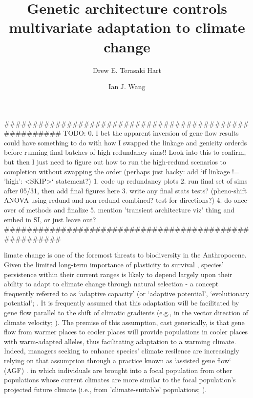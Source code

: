 \documentclass[9pt,twocolumn,twoside,lineno]{pnas-new}
\title{Genetic architecture controls multivariate adaptation to climate change}
\author[a,1]{Drew E. Terasaki Hart}
\author[a]{Ian J. Wang}
\affil[a]{Department of Environmental Science, Policy, and Management, University of California, Berkeley, CA 94720}
\begin{document}
\maketitle
\thispagestyle{firststyle}


#####################################################
TODO:
0. I bet the apparent inversion of gene flow results could have something to do with how I swapped the linkage and genicity orderds before running final batches of high-redundancy sims!! Look into this to confirm, but then I just need to figure out how to run the high-redund scenarios to completion without swapping the order (perhaps just hacky: add `if linkage != 'high': <SKIP>` statement?)
1. code up redundancy plots
2. run final set of sims after 05/31, then add final figures here
3. write any final stats tests? (pheno-shift ANOVA using redund and non-redund combined? test for directions?)
4. do once-over of methods and finalize
5. mention 'transient architecture viz' thing and embed in SI, or just leave out?
#####################################################


limate change is one of the foremost threats to biodiversity in the Anthropocene.
Given the limited long-term importance of plasticity to survival \cite{chevin},
species’ persistence within their current ranges is likely to depend largely upon their ability to
adapt to climate change through natural selection - a concept frequently referred to 
as `adaptive capacity’ (or `adaptive potential’, `evolutionary potential’; 
\cite{chevin,harrisson,nicotra,vilas,wade}.
It is frequently assumed that this adaptation will be facilitated
by gene flow parallel to the shift of climatic gradients
(e.g., in the vector
direction of climate velocity; \cite{ackerly}).
The premise of this 
assumption, cast generically, is that gene flow from warmer places to
cooler places will provide populations in cooler places with warm-adapted alleles,
thus facilitating adaptation to a warming climate. 
Indeed, managers seeking to enhance species' climate resilence
are increasingly relying on that assumption
through a practice known as `assisted gene flow` (AGF) \cite{aitken_whitlock}.
in which individuals are brought into a focal population
from other populations whose current 
climates are more similar to the focal population's projected future climate
(i.e., from 'climate-suitable' populations; \cite{bellis}).
\end{document}
